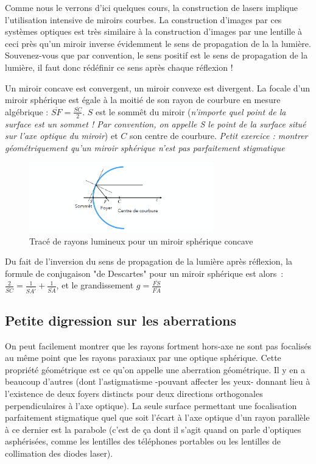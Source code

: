 \documentclass[a4paper]{book}
\begin{document}
Comme nous le verrons d'ici quelques cours, la construction de lasers implique l'utilisation intensive de miroirs courbes. La construction d'images par ces systèmes optiques est très similaire à la construction d'images par une lentille à ceci près qu'un miroir inverse évidemment le sens de propagation de la la lumière. Souvenez-vous que par convention, le sens positif est le sens de propagation de la lumière, il faut donc rédéfinir ce sens après chaque réflexion ! 

Un miroir concave est convergent, un miroir convexe est divergent. La focale d'un miroir sphérique est égale à la moitié de son rayon de courbure en mesure algébrique : $\overline{SF}=\frac{\overline{SC}}{2}$. $S$ est le sommêt du miroir (\textit{n'importe quel point de la surface est un sommet ! Par convention, on appelle S le point de la surface situé sur l'axe optique du miroir}) et $C$ son centre de courbure.
\textit{Petit exercice : montrer géométriquement qu'un miroir sphérique n'est pas parfaitement stigmatique}


\begin{figure}[!htbp]
\label{fig:miroir_concave}
\begin{center}
\includegraphics[width=8cm]{pictures/SpherMirr.png}
\end{center}
\caption{Tracé de rayons lumineux pour un miroir sphérique concave}
\end{figure}

Du fait de l'inversion du sens de propagation de la lumière après réflexion, la formule de conjugaison "de Descartes" pour un miroir sphérique est alors~: $\frac{2}{\overline{SC}}=\frac{1}{\overline{SA'}}+\frac{1}{\overline{SA}}$, et le grandissement $g = \frac{\overline{FS}}{\overline{FA}}$

\subsection{Petite digression sur les aberrations}

On peut facilement montrer que les rayons fortment hors-axe ne sont pas focalisés au même point que les rayons paraxiaux par une optique sphérique. Cette propriété géométrique est ce qu'on appelle une aberration géométrique. Il y en a beaucoup d'autres (dont l'astigmatisme -pouvant affecter les yeux- donnant lieu à l'existence de deux foyers distincts pour deux directions orthogonales perpendiculaires à l'axe optique). La seule surface permettant une focalisation parfaitement stigmatique quel que soit l'écart à l'axe optique d'un rayon parallèle à ce dernier est la parabole (c'est de ça dont il s'agit quand on parle d'optiques asphérisées, comme les lentilles des téléphones portables ou les lentilles de collimation des diodes laser).
\end{document}
